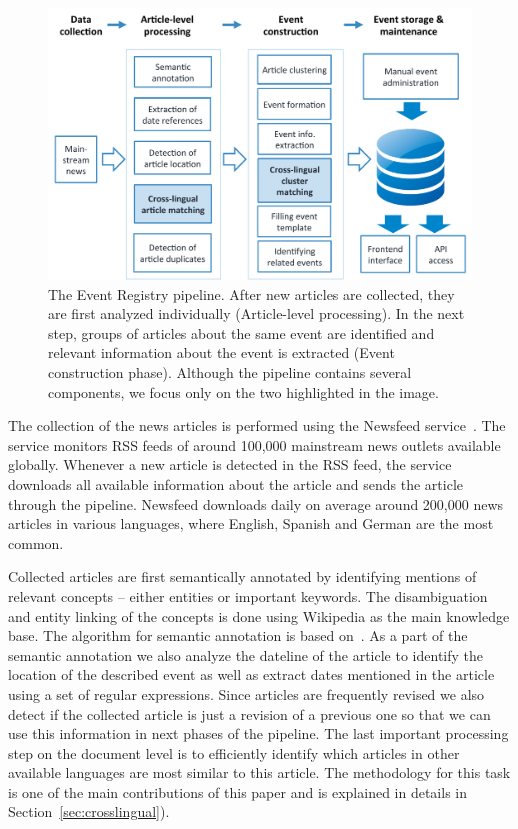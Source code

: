 \documentclass[twoside,11pt]{article}
\begin{document}
\begin{figure}[tbp]
\centering
\includegraphics[width=\textwidth]{pipeline.pdf}
\caption{\label{fig:erpipeline}  The Event Registry pipeline. After new articles are collected, they are first analyzed individually (Article-level processing). In the next step, groups of articles about the same event are identified and relevant information about the event is extracted (Event construction phase). Although the pipeline contains several components, we focus only on the two highlighted in the image.}
\end{figure}

The collection of the news articles is performed using the Newsfeed service~\cite{Trampus2012}. The service monitors RSS feeds of around 100,000 mainstream news outlets available globally. Whenever a new article is detected in the RSS feed, the service downloads all available information about the article and sends the article through the pipeline. Newsfeed downloads daily on average around 200,000 news articles in various languages, where English, Spanish and German are the most common.

Collected articles are first semantically annotated by identifying mentions of relevant concepts -- either entities or important keywords. The disambiguation and entity linking of the concepts is done using Wikipedia as the main knowledge base. The algorithm for semantic annotation is based on~\cite{zhang2014saaacamactat}. As a part of the semantic annotation we also analyze the dateline of the article to identify the location of the described event as well as extract dates mentioned in the article using a set of regular expressions. Since articles are frequently revised we also detect if the collected article is just a revision of a previous one so that we can use this information in next phases of the pipeline. The last important processing step on the document level is to efficiently identify which articles in other available languages are most similar to this article. The methodology for this task is one of the main contributions of this paper and is explained in details in Section~\ref{sec:crosslingual}).
\end{document}
